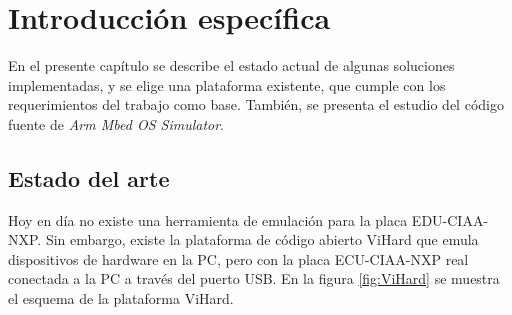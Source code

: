 \chapter{Introducción específica} %
\label{Chapter2}


En el presente capítulo se describe el estado actual de algunas soluciones implementadas, y se elige una plataforma existente, que cumple con los requerimientos del trabajo como base. También, se presenta el estudio del código fuente de \textit{Arm Mbed OS Simulator}. 

\section{Estado del arte}
\label{sec:Estado del arte}

Hoy en día no existe una herramienta de emulación para la placa EDU-CIAA-NXP. Sin embargo, existe la plataforma de código abierto ViHard \citep{ViHard} que emula dispositivos de hardware en la PC, pero con la placa ECU-CIAA-NXP real conectada a la PC a través del puerto USB. En la figura \ref{fig:ViHard} se muestra el esquema de la plataforma ViHard.

